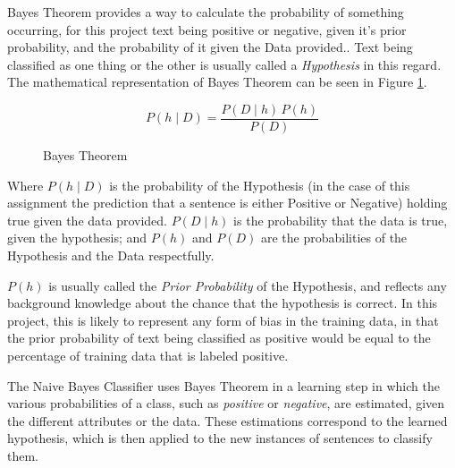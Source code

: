 Bayes Theorem provides a way to calculate the probability of something occurring, for this project text being positive or negative, given it's prior probability, and the probability of it given the Data provided.\cite{Mitchell1997}. Text being classified as one thing or the other is usually called a \emph{Hypothesis} in this regard. The mathematical representation of Bayes Theorem can be seen in Figure \ref{fig:bayes_theorem}.
\begin{figure}[ht]
$$ P(h \mid D) = \frac{P(D \mid h) \, P(h)}{P(D)} $$
\caption{Bayes Theorem}
\label{fig:bayes_theorem}
\end{figure}

Where $P(h \mid D)$ is the probability of the Hypothesis (in the case of this assignment the prediction that a sentence is either Positive or Negative) holding true given the data provided. $P(D \mid h)$ is the probability that the data is true, given the hypothesis; and $P(h)$ and $P(D)$ are the probabilities of the Hypothesis and the Data respectfully.

$P(h)$ is usually called the \emph{Prior Probability} of the Hypothesis, and reflects any background knowledge about the chance that the hypothesis is correct. In this project, this is likely to represent any form of bias in the training data, in that the prior probability of text being classified as positive would be equal to the percentage of training data that is labeled positive.

The Naive Bayes Classifier uses Bayes Theorem in a learning step in which the various probabilities of a class, such as \emph{positive} or \emph{negative}, are estimated, given the different attributes or the data\cite{Mitchell1997}. These estimations correspond to the learned hypothesis, which is then applied to the new instances of sentences to classify them.

